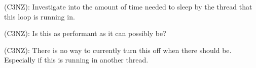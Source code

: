 
\begin{DoxyRefList}
\item[Member \mbox{\hyperlink{classlambda_1_1core_1_1io_1_1EventLoop_a00fd46aae12da78a44086ab1247d5629}{lambda\+::core\+::io\+::Event\+Loop\+::Run}} ()]\label{todo__todo000001}%
%
(C3\+NZ)\+: Investigate into the amount of time needed to sleep by the thread that this loop is running in. 

(C3\+NZ)\+: Is this as performant as it can possibly be? 

(C3\+NZ)\+: There is no way to currently turn this off when there should be. Especially if this is running in another thread. 
\end{DoxyRefList}